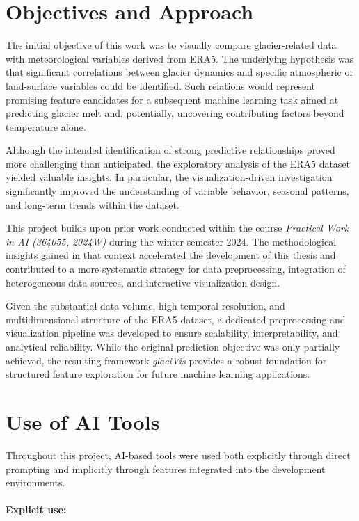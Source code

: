 \newpage


\section{Objectives and Approach}
\label{sec:introduction:objectives}
The initial objective of this work was to visually compare glacier-related data with meteorological variables derived from ERA5.
The underlying hypothesis was that significant correlations between glacier dynamics and specific atmospheric or land-surface variables could be identified. 
Such relations would represent promising feature candidates for a subsequent machine learning task aimed at predicting glacier melt and, potentially, uncovering contributing factors beyond temperature alone.

Although the intended identification of strong predictive relationships proved more challenging than anticipated, the exploratory analysis of the ERA5 dataset yielded valuable insights.
In particular, the visualization-driven investigation significantly improved the understanding of variable behavior, seasonal patterns, and long-term trends within the dataset.

This project builds upon prior work conducted within the course \textit{Practical Work in AI (364055, 2024W)} during the winter semester 2024.
The methodological insights gained in that context accelerated the development of this thesis and contributed to a more systematic strategy for data preprocessing, integration of heterogeneous data sources, and interactive visualization design.

Given the substantial data volume, high temporal resolution, and multidimensional structure of the ERA5 dataset, a dedicated preprocessing and visualization pipeline was developed to ensure scalability, interpretability, and analytical reliability. While the original prediction objective was only partially achieved, the resulting framework \textit{glaciVis} provides a robust foundation for structured feature exploration for future machine learning applications.

\section{Use of AI Tools}
\label{sec:use_of_ai}
Throughout this project, AI-based tools were used both explicitly through
direct prompting and implicitly through features integrated into the
development environments.

\paragraph{Explicit use:}\mbox{}\\

